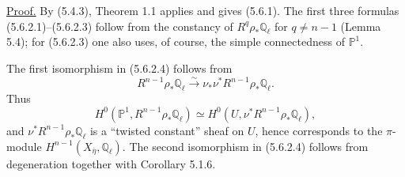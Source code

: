 \underline{Proof.}
By (5.4.3), Theorem 1.1 applies and gives (5.6.1).  The first three
formulas (5.6.2.1)--(5.6.2.3) follow from the constancy of
$R^q\rho_*\mathbb Q_\ell$ for $q\neq n-1$ (Lemma 5.4); for (5.6.2.3) one
also uses, of course, the simple connectedness of $\mathbb P^1$.

The first isomorphism in (5.6.2.4) follows from
\[
R^{n-1}\rho_*\mathbb Q_\ell
\overset{\sim}{\longrightarrow}
\nu_*\nu^*R^{n-1}\rho_*\mathbb Q_\ell.
\]
Thus
\[
H^0(\mathbb P^1,R^{n-1}\rho_*\mathbb Q_\ell)
\simeq
H^0(U,\nu^*R^{n-1}\rho_*\mathbb Q_\ell),
\]
and $\nu^*R^{n-1}\rho_*\mathbb Q_\ell$ is a
\textquotedblleft twisted constant\textquotedblright{} sheaf on $U$, hence
corresponds to the $\pi$-module
$H^{n-1}(X_{\bar\eta},\mathbb Q_\ell)$.  The second isomorphism in
(5.6.2.4) follows from degeneration together with Corollary 5.1.6.

